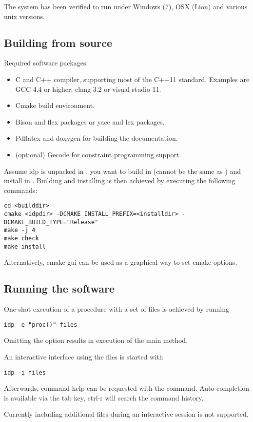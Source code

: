 
The system has been verified to run under Windows (7), OSX (Lion) and various unix versions.

\subsection{Building from source}
Required software packages:
\begin{itemize}
  \item C and C++ compiler, supporting most of the C++11 standard. Examples are GCC 4.4 or higher, clang 3.2 or visual studio 11.
  \item Cmake build environment. 
  \item Bison and flex packages or yacc and lex packages.
  \item Pdflatex and doxygen for building the documentation.
  \item (optional) Gecode for constraint programming support.
\end{itemize}

Assume idp is unpacked in , you want to build in  (cannot be the same as ) and install in . Building and installing is then achieved by executing the following commands:
\begin{lstlisting}
cd <builddir>
cmake <idpdir> -DCMAKE_INSTALL_PREFIX=<installdir> -DCMAKE_BUILD_TYPE="Release"
make -j 4
make check
make install
\end{lstlisting}

Alternatively, cmake-gui can be used as a graphical way to set cmake options.

\subsection{Running the software}
One-shot execution of a procedure  with a set of files  is achieved by running
\begin{lstlisting}
idp -e "proc()" files
\end{lstlisting}
Omitting the  option results in execution of the main method.

An interactive interface using the files  is started with 
\begin{lstlisting}
idp -i files
\end{lstlisting}

Afterwards, command help can be requested with the  command. Auto-completion is available via the tab key, ctrl-r will search the command history.

Currently including additional files during an interactive session is not supported.
